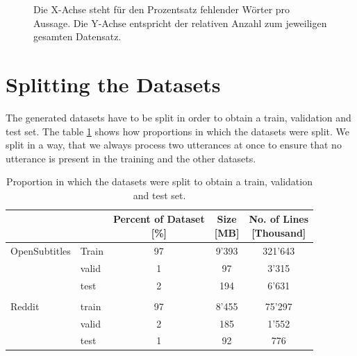 \begin{figure}[htb]
	\centering
	\small
	\endminipage
	\caption{Die X-Achse steht für den Prozentsatz fehlender Wörter pro Aussage. Die Y-Achse entspricht der relativen Anzahl zum jeweiligen gesamten Datensatz.}
	\label{fig:data:reddit:vocab:analyze}
\end{figure}

\section{Splitting the Datasets}
The generated datasets have to be split in order to obtain a train, validation and test set. The table \ref{tbl:data:split:corpus} shows how proportions in which the datasets were split. We split in a way, that we always process two utterances at once to ensure that no utterance is present in the training and the other datasets.
\\
\begin{table}[H]
	\centering
	\begin{adjustbox}{max width=\textwidth}
		\centering
		\small
		\begin{tabular}{llccc}
			\toprule
			&  \specialcell{Set}
			&  \specialcell{Percent of Dataset \\ {[\%]}}
			&  \specialcell{Size \\{[MB]}}
			&  \specialcell{No. of Lines \\{[Thousand]}}\\
			\midrule
			OpenSubtitles	& Train	&97	&9'393	&321'643	\\
			&valid	&1	&97		&3'315	\\
			&test	&2	&194	&6'631	\\\\
			Reddit			&train	&97	&8'455	&75'297	\\
			&valid	&2	&185	&1'552	\\
			&test	&1	&92		&776	\\
			\bottomrule
		\end{tabular}
	\end{adjustbox}
	\caption{Proportion in which the datasets were split to obtain a train, validation and test set.}
	\label{tbl:data:split:corpus}
\end{table}


